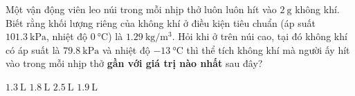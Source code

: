 \begin{ex}
Một vận động viên leo núi trong mỗi nhịp thở luôn luôn hít vào $\SI{2}{\gram}$ không khí. Biết rằng khối lượng riêng của không khí ở điều kiện tiêu chuẩn (áp suất $\SI{101.3}{\kilo\pascal}$, nhiệt độ $\SI{0}{\celsius}$) là $\SI{1.29}{\kilogram/\meter^3}$. Hỏi khi ở trên núi cao, tại đó không khí có áp suất là $\SI{79.8}{\kilo\pascal}$ và nhiệt độ $\SI{-13}{\celsius}$ thì thể tích không khí mà người ấy hít vào trong mỗi nhịp thở \textbf{gần với giá trị nào nhất} sau đây?
	
	\choice
	{$\SI{1.3}{\liter}$}
	{$\SI{1.8}{\liter}$}
	{$\SI{2.5}{\liter}$}
	{\True $\SI{1.9}{\liter}$}
\end{ex}
